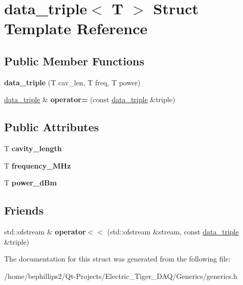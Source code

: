 \hypertarget{structdata__triple}{}\section{data\+\_\+triple$<$ T $>$ Struct Template Reference}
\label{structdata__triple}
\subsection*{Public Member Functions}
\begin{DoxyCompactItemize}
\item 
{\bfseries data\+\_\+triple} (T cav\+\_\+len, T freq, T power)\hypertarget{structdata__triple_a223be233f58eb5cb136fb0be322b4cb7}{}\label{structdata__triple_a223be233f58eb5cb136fb0be322b4cb7}

\item 
\hyperlink{structdata__triple}{data\+\_\+triple} \& {\bfseries operator=} (const \hyperlink{structdata__triple}{data\+\_\+triple} \&triple)\hypertarget{structdata__triple_a7da3f3ea534c4217ad69b110b087398c}{}\label{structdata__triple_a7da3f3ea534c4217ad69b110b087398c}

\end{DoxyCompactItemize}
\subsection*{Public Attributes}
\begin{DoxyCompactItemize}
\item 
T {\bfseries cavity\+\_\+length}\hypertarget{structdata__triple_a0c009762d01c841ed025b80a12955419}{}\label{structdata__triple_a0c009762d01c841ed025b80a12955419}

\item 
T {\bfseries frequency\+\_\+\+M\+Hz}\hypertarget{structdata__triple_a50bc0714de99feb9e3fcb1fa868d082b}{}\label{structdata__triple_a50bc0714de99feb9e3fcb1fa868d082b}

\item 
T {\bfseries power\+\_\+d\+Bm}\hypertarget{structdata__triple_a6f88f895f5d91c784ef723e87d904c14}{}\label{structdata__triple_a6f88f895f5d91c784ef723e87d904c14}

\end{DoxyCompactItemize}
\subsection*{Friends}
\begin{DoxyCompactItemize}
\item 
std\+::ofstream \& {\bfseries operator$<$$<$} (std\+::ofstream \&stream, const \hyperlink{structdata__triple}{data\+\_\+triple} \&triple)\hypertarget{structdata__triple_a7427c6054c2f2b559c384fc92da91e77}{}\label{structdata__triple_a7427c6054c2f2b559c384fc92da91e77}

\end{DoxyCompactItemize}


The documentation for this struct was generated from the following file\+:\begin{DoxyCompactItemize}
\item 
/home/bephillips2/\+Qt-\/\+Projects/\+Electric\+\_\+\+Tiger\+\_\+\+D\+A\+Q/\+Generics/generics.\+h\end{DoxyCompactItemize}
